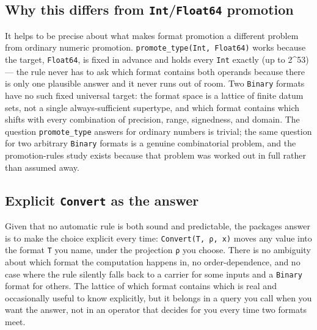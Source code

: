 \subsection{Why this differs from \texttt{Int}/\allowbreak\texttt{Float64} promotion}



\label{7463766682595139252}{}


It helps to be precise about what makes format promotion a different problem from ordinary numeric promotion. \texttt{promote\_\allowbreak{}type(\allowbreak{}Int, Float64)} works because the target, \texttt{Float64}, is fixed in advance and holds every \texttt{Int} exactly (up to 2{\textasciicircum}53) — the rule never has to ask {\textquotedbl}which format contains both operands{\textquotedbl} because there is only one plausible answer and it never runs out of room. Two \texttt{Binary} formats have no such fixed universal target: the format space is a lattice of finite datum sets, not a single always-sufficient supertype, and which format contains which shifts with every combination of precision, range, signedness, and domain. The question \texttt{promote\_\allowbreak{}type} answers for ordinary numbers is trivial; the same question for two arbitrary \texttt{Binary} formats is a genuine combinatorial problem, and the promotion-rules study exists because that problem was worked out in full rather than assumed away.



\subsection{Explicit \texttt{Convert} as the answer}



\label{705282074153534982}{}


Given that no automatic rule is both sound and predictable, the package{\textquotesingle}s answer is to make the choice explicit every time: \texttt{Convert(T, ρ, x)} moves any value into the format \texttt{T} you name, under the projection \texttt{ρ} you choose. There is no ambiguity about which format the computation happens in, no order-dependence, and no case where the rule silently falls back to a carrier for some inputs and a \texttt{Binary} format for others. The lattice of which format contains which is real and occasionally useful to know explicitly, but it belongs in a query you call when you want the answer, not in an operator that decides for you every time two formats meet.



